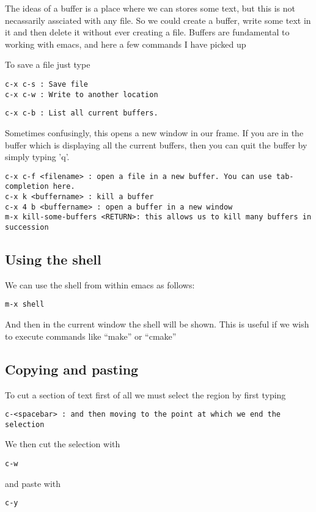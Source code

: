 \documentclass[a4paper, 10pt]{article}
\begin{document}
The ideas of a buffer is a place where we can stores some text, but this is not necassarily assciated with any file. So we could create a buffer, write some text in it and then delete it without ever creating a file. Buffers are fundamental to working with emacs, and here a few commands I have picked up

To save a file just type
\begin{verbatim}
c-x c-s : Save file
c-x c-w : Write to another location
\end{verbatim}


\begin{verbatim}
c-x c-b : List all current buffers. 
\end{verbatim}
Sometimes confusingly, this opens a new window in our frame. If you are in the  buffer which is displaying all the current buffers, then you can quit the buffer by simply typing 'q'.
\begin{verbatim}
c-x c-f <filename> : open a file in a new buffer. You can use tab-completion here.
c-x k <buffername> : kill a buffer
c-x 4 b <buffername> : open a buffer in a new window
m-x kill-some-buffers <RETURN>: this allows us to kill many buffers in succession
\end{verbatim}

\subsection*{Using the shell}
We can use the shell from within emacs as follows:
\begin{verbatim}
m-x shell
\end{verbatim}
And then in the current window the shell will be shown. This is useful if we wish to execute commands like ``make'' or ``cmake''
 
\subsection*{Copying and pasting}
To cut a section of text first of all we must select the region by first typing
\begin{verbatim}
c-<spacebar> : and then moving to the point at which we end the selection
\end{verbatim}
We then cut the selection with 
\begin{verbatim}
c-w
\end{verbatim}
and paste with 
\begin{verbatim}
c-y
\end{verbatim}
\end{document}
